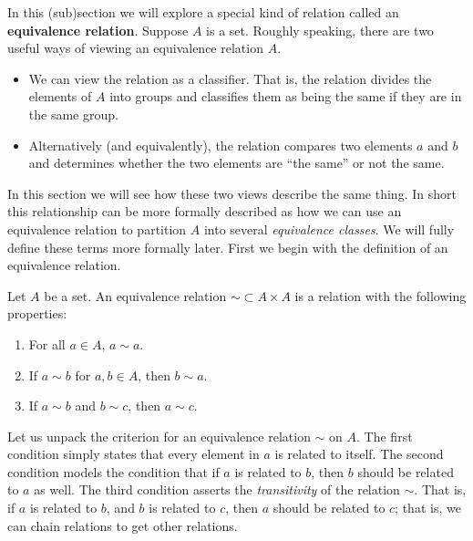 In this (sub)section we will explore a special kind of relation called an \textbf{equivalence relation}. Suppose $A$ is a set. Roughly speaking, there are two useful ways of viewing an equivalence relation $A$.
\begin{itemize}
	\item We can view the relation as a classifier. That is, the relation divides the elements of $A$ into groups and classifies them as being the same if they are in the same group.
	\item Alternatively (and equivalently), the relation compares two elements $a$ and $b$ and determines whether the two elements are ``the same'' or not the same.
\end{itemize}

In this section we will see how these two views describe the same thing. In short this relationship can be more formally described as how we can use an equivalence relation to partition $A$ into several \textit{equivalence classes}. We will fully define these terms more formally later. First we begin with the definition of an equivalence relation. 

\begin{definition}
Let $A$ be a set. An equivalence relation $\sim \subset A \times A$ is a relation with the following properties:
\begin{enumerate}
	\item For all $a \in A$, $a \sim a$.
	\item If $a \sim b$ for $a, b \in A$, then $b \sim a$.
	\item If $a \sim b$ and $b \sim c$, then $a \sim c$. 
\end{enumerate}


\end{definition}

Let us unpack the criterion for an equivalence relation $\sim$ on $A$. The first condition simply states that every element in $a$ is related to itself. The second condition models the condition that if $a$ is related to $b$, then $b$ should be related to $a$ as well. The third condition asserts the \textit{transitivity} of the relation $\sim$. That is, if $a$ is related to $b$, and $b$ is related to $c$, then $a$ should be related to $c$; that is, we can chain relations to get other relations.

